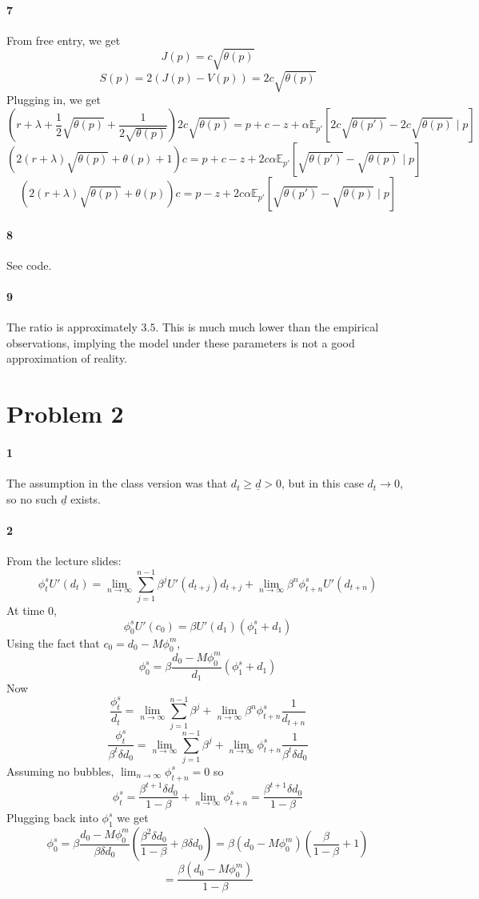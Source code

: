 \documentclass[10pt,letter]{article}
\newcommand{\problem}[1]{\section*{Problem #1}}
\newcommand{\problempart}[1]{\paragraph{#1}}
\begin{document}
\problempart{7}
From free entry, we get
\[ J(p) = c \sqrt{\theta(p)} \]
\[ S(p) = 2 (J(p) - V(p)) = 2c\sqrt{\theta(p)} \]
Plugging in, we get
\[ \left(r + \lambda + \frac{1}{2}\sqrt{\theta(p)} + \frac{1}{2\sqrt{\theta(p)}}\right)2c\sqrt{\theta(p)} = p + c - z + \alpha \mathbb{E}_{p'}[2c\sqrt{\theta(p')} - 2c\sqrt{\theta(p)} \mid p] \]
\[ \left(2(r + \lambda)\sqrt{\theta(p)} + \theta(p)+ 1\right)c = p + c - z + 2c\alpha \mathbb{E}_{p'}[\sqrt{\theta(p')} - \sqrt{\theta(p)} \mid p] \]
\[ \left(2(r + \lambda)\sqrt{\theta(p)} + \theta(p)\right)c = p  - z + 2c\alpha \mathbb{E}_{p'}[\sqrt{\theta(p')} - \sqrt{\theta(p)} \mid p] \]
\problempart{8} See code.
\problempart{9} The ratio is approximately $3.5$. This is much much lower than the empirical observations, implying the model under these parameters is not a good approximation of reality.
\problem{2}
\problempart{1} The assumption in the class version was that $d_t \ge \underline{d} > 0$, but in this case $d_t \to 0$, so no such $\underline{d}$ exists.
\problempart{2}
From the lecture slides:
\[ \phi_t^s U'(d_t) = \lim_{n \to \infty} \sum_{j=1}^{n-1}\beta^j U'(d_{t+j})d_{t+j} + \lim_{n\to\infty}\beta^n\phi_{t+n}^sU'(d_{t+n}) \]
At time 0,
\[  \phi_0^s U'(c_0) = \beta U'(d_1)(\phi^s_{1} + d_1) \]
Using the fact that $c_0 = d_0 - M \phi_0^m $,
\[  \phi_0^s  = \beta \frac{d_0 - M \phi_0^m}{d_1}(\phi^s_{1} + d_1) \]
Now
\[ \frac{\phi_t^s}{d_t}  = \lim_{n \to \infty} \sum_{j=1}^{n-1}\beta^j  + \lim_{n\to\infty}\beta^n\phi_{t+n}^s\frac{1}{d_{t+n}} \]
\[ \frac{\phi_t^s}{\beta^t \delta d_0}  = \lim_{n \to \infty} \sum_{j=1}^{n-1}\beta^j  + \lim_{n\to\infty}\phi_{t+n}^s\frac{1}{\beta^t \delta d_0} \]
Assuming no bubbles, $\lim_{n\to\infty}\phi_{t+n}^s = 0$ so
\[ \phi_t^s  = \frac{\beta^{t+1} \delta d_0}{1-\beta}   + \lim_{n\to\infty}\phi_{t+n}^s = \frac{\beta^{t+1} \delta d_0}{1-\beta} \]
Plugging back into $\phi_1^s$ we get
\[  \phi_0^s  = \beta \frac{d_0 - M \phi_0^m}{\beta \delta d_0}\left(\frac{\beta^{2} \delta d_0}{1-\beta} + \beta \delta d_0\right) = \beta (d_0 - M \phi_0^m)\left(\frac{\beta}{1-\beta} + 1\right) \]
\[   = \frac{\beta(d_0 - M \phi_0^m)}{1-\beta} \]
\end{document}
